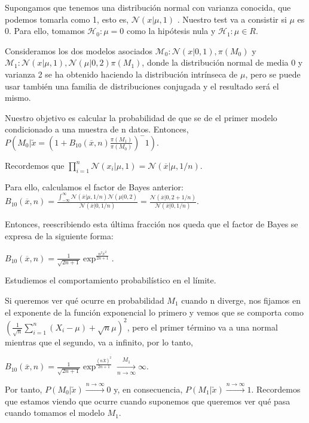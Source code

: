 \begin{ex}

	Supongamos que tenemos una distribución normal con varianza conocida, que podemos tomarla como 1, esto es, $\mathcal{N}(x | \mu,1)$ . Nuestro test va a consistir si $\mu$ es $0$. Para ello, tomamos $\mathcal{H}_0 : \mu = 0$ como la hipótesis nula y $\mathcal{H}_1 : \mu \in R$.

	Consideramos los dos modelos asociados $\mathcal{M}_0 : {\mathcal{N}(x | 0,1), \pi(M_0)}$ y $\mathcal{M}_1 : {\mathcal{N}(x| \mu,1), \mathcal{N}(\mu |0,2)\pi(M_1)}$, donde la distribución normal de media 0 y varianza 2 se ha obtenido haciendo la distribución intrínseca de $\mu$, pero se puede usar también una familia de distribuciones conjugada y el resultado será el mismo.

	Nuestro objetivo es calcular la probabilidad de que se de el primer modelo condicionado a una muestra de n datos. Entonces, $P(M_0 | \utilde{x} = (1 + B_{10}(\overline{x},n) \frac{\pi(M_1)}{\pi(M_0)})^-1)$.

	Recordemos que $\prod_{i=1}^{n}\mathcal{N}(x_i |\mu,1) = \mathcal{N}(\overline{x} | \mu, 1/n)$.

	Para ello, calculamos el factor de Bayes anterior: $B_{10}(\overline{x},n) = \frac{\int_{-\infty}^{\infty}{\mathcal{N}(\overline{x} | \mu, 1/n) \mathcal{N}(\mu | 0,2)}}{\mathcal{N}(\overline{x} | 0, 1/n)} = \frac{\mathcal{N}(\overline{x} | 0, 2 + 1/n)}{\mathcal{N}(\overline{x} | 0, 1/n)}$.

	Entonces, reescribiendo esta última fracción nos queda que el factor de Bayes se expresa de la siguiente forma:

	$B_{10}(\overline{x},n) = \frac{1}{\sqrt{2n+1}}  \exp^\frac{n^2  \overline{x}^2}{2n+1}$.

	Estudiemos el comportamiento probabilístico en el límite.

	Si queremos ver qué ocurre en probabilidad $M_1$ cuando n diverge, nos fijamos en el exponente de la función exponencial lo primero y vemos que se comporta como $(\frac{1}{\sqrt{n}} \sum_{i=1}^{n}(X_i - \mu)  + \sqrt{n}\mu)^2$, pero el primer término va a una normal mientras que el segundo, va a infinito, por lo tanto,

	$B_{10}(\overline{x},n) = \frac{1}{\sqrt{2n+1}}  \exp^\frac{(n  \overline{X})^2}{2n+1} \xrightarrow[n\to\infty]{M_1} \infty$.

	Por tanto, $P(M_0 | \utilde{x}) \xrightarrow{n\to\infty} 0$ y, en consecuencia, $P(M_1 | \utilde{x}) \xrightarrow{n\to\infty} 1$. Recordemos que estamos viendo que ocurre cuando suponemos que queremos ver qué pasa cuando tomamos el modelo $M_1$.


\end{ex}
